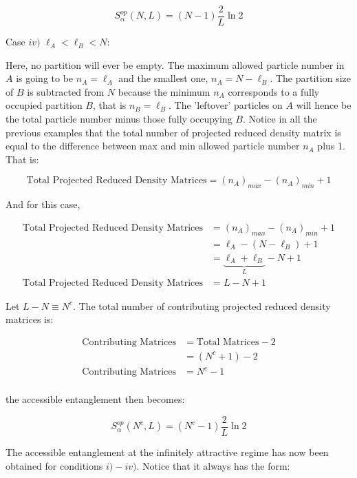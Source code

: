 \begin{equation}
S_{\alpha}^{op} (N, L) = (N - 1) \frac{2}{L} \ln{2}
\end{equation}

Case $iv)$ $\ell_{A} < \ell_{B} < N$:

Here, no partition will ever be empty. The maximum allowed particle number in $A$ is going to be $n_{A} = \ell_{A}$ and the smallest one, $n_{A} = N - \ell_{B}$. The partition size of $B$ is subtracted from $N$ because the minimum $n_A$ corresponds to a fully occupied partition $B$, that is $n_B = \ell_B$. The 'leftover' particles on $A$ will hence be the total particle number minus those fully occupying $B$. Notice in all the previous examples that the total number of projected reduced density matrix is equal to the difference between max and min allowed particle number $n_A$ plus 1. That is:

\begin{equation}
\text{Total Projected Reduced Density Matrices} = (n_A)_{max} - (n_A)_{min} + 1
\end{equation}

And for this case,

 \begin{align}
\text{Total Projected Reduced Density Matrices} &= (n_A)_{max} - (n_A)_{min} + 1 \nonumber \\
&= \ell_A - (N-\ell_B) + 1 \nonumber \\
&= \underbrace{\ell_A + \ell_B}_{L} - N + 1 \nonumber \\
\text{Total Projected Reduced Density Matrices} &= L - N + 1
\end{align}

Let $L-N \equiv N^c$. The total number of contributing projected reduced density matrices is:

\begin{align}
\text{Contributing Matrices} &= \text{Total Matrices} - 2 \nonumber \\
&= (N^c + 1) - 2 \nonumber \\
\text{Contributing Matrices} &= N^c - 1 \\
\end{align}

the accessible entanglement then becomes:

\begin{equation}
S_\alpha^{op}(N^c,L) = (N^c - 1) \frac{2}{L} \ln{2}
\end{equation}

The accessible entanglement at the infinitely attractive regime has now been obtained for conditions $i)-iv)$. Notice that it always has the form:

